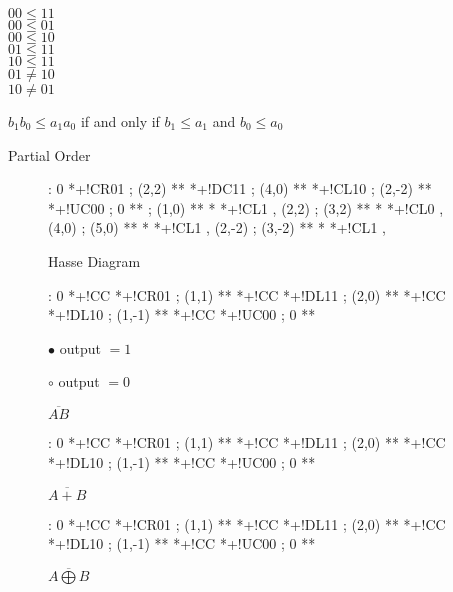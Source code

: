 \documentclass[a4paper,12pt]{article}
\begin{document}
$00 \leq 11$ \\
$00 \leq 01$ \\
$00 \leq 10$ \\
$01 \leq 11$ \\
$10 \leq 11$ \\
$01 \not= 10$ \\
$10 \not= 01$

$b_{1} b_{0} \leq a_{1} a_{0}$ if and only if $b_{1} \leq a_{1}$ and
$b_{0} \leq a_{0}$


Partial Order

\begin{figure}[ht]

\xy <1cm,0cm>:
0 *+!CR{01} ; (2,2) **\dir{-} *+!DC{11} ;
(4,0) **\dir{-} *+!CL{10} ;
(2,-2) **\dir{-} *+!UC{00} ;
0 **\dir{-} ;
(1,0) **\dir{-} *\dir{>} *+!CL{1} ,
(2,2) ; (3,2) **\dir{-} *\dir{>} *+!CL{0} ,
(4,0) ; (5,0) **\dir{-} *\dir{>} *+!CL{1} ,
(2,-2) ; (3,-2) **\dir{-} *\dir{>} *+!CL{1} ,
\endxy

\caption{Hasse Diagram}

\end{figure}

\begin{figure}[ht]

\xy <1cm,0cm>:
0 *+!CC{\bullet} *+!CR{01} ; (1,1) **\dir{-} *+!CC{\circ} *+!DL{11} ;
(2,0) **\dir{-} *+!CC{\bullet} *+!DL{10} ;
(1,-1) **\dir{-} *+!CC{\bullet} *+!UC{00} ;
0 **\dir{-}
\endxy

$\bullet$ output $= 1$

$\circ$ output $= 0$

\caption{$\overline{AB}$}

\end{figure}

\begin{figure}[ht]

\xy <1cm,0cm>:
0 *+!CC{\circ} *+!CR{01} ; (1,1) **\dir{-} *+!CC{\circ} *+!DL{11} ;
(2,0) **\dir{-} *+!CC{\circ} *+!DL{10} ;
(1,-1) **\dir{-} *+!CC{\bullet} *+!UC{00} ;
0 **\dir{-}
\endxy

\caption{$\overline{A + B}$}

\end{figure}

\begin{figure}[ht]

\xy <1cm,0cm>:
0 *+!CC{\bullet} *+!CR{01} ; (1,1) **\dir{-} *+!CC{\circ} *+!DL{11} ;
(2,0) **\dir{-} *+!CC{\bullet} *+!DL{10} ;
(1,-1) **\dir{-} *+!CC{\circ} *+!UC{00} ;
0 **\dir{-}
\endxy

\caption{$\overline{A \bigoplus B}$}

\end{figure}
\end{document}
